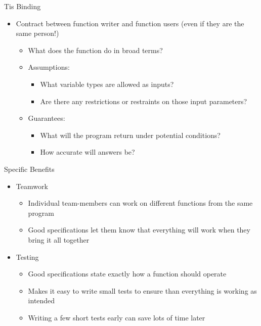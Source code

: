 \documentclass[pdf, aspectratio=169, 12pt]{beamer}
\begin{document}
\begin{frame}{Tis Binding}
	\begin{itemize}
		\item Contract between function writer and function users (even if they are the same person!)
			\begin{itemize}
				\item What does the function do in broad terms?
				\item Assumptions:
					\begin{itemize}
						\item What variable types are allowed as inputs?
						\item Are there any restrictions or restraints on those input parameters?
					\end{itemize}
				\item Guarantees:
					\begin{itemize}
						\item What will the program return under potential conditions?
						\item How accurate will answers be?
					\end{itemize}
			\end{itemize}
	\end{itemize}
\end{frame}

\begin{frame}{Specific Benefits}
	\begin{itemize}
		\item Teamwork
			\begin{itemize}
				\item Individual team-members can work on different functions from the same program
				\item Good specifications let them know that everything will work when they bring it all together
			\end{itemize}
		\item Testing
			\begin{itemize}
				\item Good specifications state exactly how a function should operate
				\item Makes it easy to write small tests to ensure than everything is working as intended
				\item Writing a few short tests early can save lots of time later
			\end{itemize}
	\end{itemize}
\end{frame}
\end{document}
